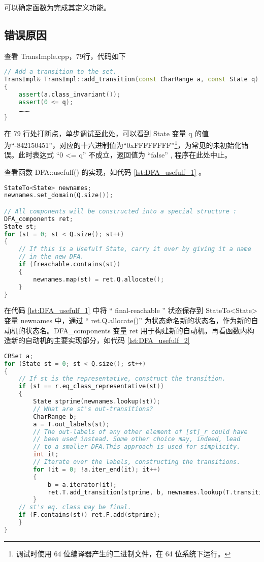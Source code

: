 可以确定函数为完成其定义功能。

\subsection{错误原因}

查看 TransImple.cpp，79行，代码如下
\lstset{style=mystyle}
\begin{lstlisting}[language=C++,label={lst:TransImple},caption={ TransImple.cpp },firstnumber=75]
// Add a transition to the set.
TransImpl& TransImpl::add_transition(const CharRange a, const State q)
{
    assert(a.class_invariant());
    assert(0 <= q);
    ………
}
\end{lstlisting}

在 79 行处打断点，单步调试至此处，可以看到 State 变量 q 的值为“-842150451”，对应的十六进制值为“0xFFFFFFFF”\footnote{调试时使用 64 位编译器产生的二进制文件，在 64 位系统下运行。}，为常见的未初始化错误。此时表达式 “0 <= q” 不成立，返回值为 “false” , 程序在此处中止。

查看函数 DFA::usefulf() 的实现，如代码 \ref{lst:DFA_usefulf_1} 。
\lstset{style=mystyle}
\begin{lstlisting}[language=C++,label={lst:DFA_usefulf_1},caption={ DFA.cpp },firstnumber=84]
StateTo<State> newnames;
newnames.set_domain(Q.size());

// All components will be constructed into a special structure :
DFA_components ret;
State st;
for (st = 0; st < Q.size(); st++)
{
    // If this is a Usefulf State, carry it over by giving it a name
    // in the new DFA.
    if (freachable.contains(st))
    {
        newnames.map(st) = ret.Q.allocate();
    }
}
\end{lstlisting}
在代码 \ref{lst:DFA_usefulf_1} 中将 “ final-reachable ” 状态保存到 StateTo<State> 变量 newnames 中，通过 “ ret.Q.allocate()” 为状态命名新的状态名，作为新的自动机的状态名。DFA\_components 变量 ret 用于构建新的自动机，再看函数内构造新的自动机的主要实现部分，如代码 \ref{lst:DFA_usefulf_2}
\lstset{style=mystyle}
\begin{lstlisting}[language=C++,label={lst:DFA_usefulf_2},caption={ DFA.cpp },firstnumber=115]
CRSet a;
for (State st = 0; st < Q.size(); st++)
{
    // If st is the representative, construct the transition.
    if (st == r.eq_class_representative(st))
    {
        State stprime(newnames.lookup(st));
        // What are st's out-transitions?
        CharRange b;
        a = T.out_labels(st);
        // The out-labels of any other element of [st]_r could have
        // been used instead. Some other choice may, indeed, lead
        // to a smaller DFA.This approach is used for simplicity.
        int it;
        // Iterate over the labels, constructing the transitions.
        for (it = 0; !a.iter_end(it); it++)
        {
            b = a.iterator(it);
            ret.T.add_transition(stprime, b, newnames.lookup(T.transition_on_range(st, b)));
        }
    // st's eq. class may be final.
    if (F.contains(st)) ret.F.add(stprime);
    }
}
\end{lstlisting}

